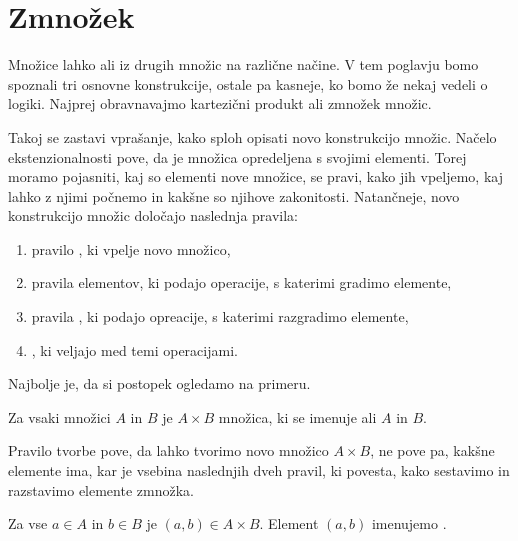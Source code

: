 

\section{Zmnožek}
\label{sec:kartezicni-produkt}

Množice lahko  ali  iz drugih množic na različne načine. V
tem poglavju bomo spoznali tri osnovne konstrukcije, ostale pa kasneje, ko bomo že nekaj
vedeli o logiki. Najprej obravnavajmo kartezični produkt ali zmnožek množic.

Takoj se zastavi vprašanje, kako sploh opisati novo konstrukcijo množic. Načelo
ekstenzionalnosti pove, da je množica opredeljena s svojimi elementi. Torej moramo
pojasniti, kaj so elementi nove množice, se pravi, kako jih vpeljemo, kaj lahko z njimi
počnemo in kakšne so njihove zakonitosti. Natančneje, novo konstrukcijo množic
določajo naslednja pravila:
%
\begin{enumerate}
\item pravilo , ki vpelje novo množico,
\item pravila  elementov, ki podajo operacije, s katerimi gradimo elemente,
\item pravila , ki podajo opreacije, s katerimi razgradimo elemente,
\item {}, ki veljajo med temi operacijami.
\end{enumerate}
%
Najbolje je, da si postopek ogledamo na primeru.

\begin{pravilo}
  \label{pravilo:zmnozek-tvorba}
  Za vsaki množici $A$ in $B$ je $A \times B$ množica, ki se imenuje  ali
   $A$ in $B$.
\end{pravilo}

\noindent
%
Pravilo tvorbe pove, da lahko tvorimo novo množico $A \times B$, ne pove pa, kakšne
elemente ima, kar je vsebina naslednjih dveh pravil, ki povesta, kako sestavimo in
razstavimo elemente zmnožka.

\begin{pravilo}
  \label{pravilo:zmnozek-vpeljava}
  Za vse $a \in A$ in $b \in B$ je $(a, b) \in A \times B$. Element $(a, b)$ imenujemo
  .
\end{pravilo}

